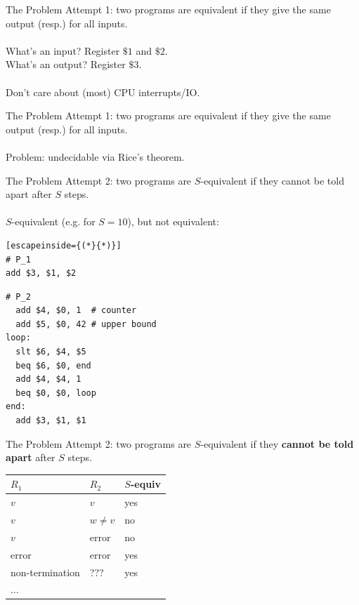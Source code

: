 \documentclass[pdf]{beamer}
\begin{document}
\begin{frame}{The Problem}
Attempt 1: two programs are equivalent if they give the same output (resp.) for all inputs.
\pause
\\~\\
\pause
What's an input?
\pause
Register $\$1$ and $\$2$.
\pause
\\
What's an output?
\pause
Register $\$3$. 
\pause
\\~\\
Don't care about (most) CPU interrupts/IO.
\end{frame}

\begin{frame}{The Problem}
Attempt 1: two programs are equivalent if they give the same output (resp.) for all inputs.
\pause
\\~\\
Problem: undecidable via Rice's theorem.
\end{frame}

\begin{frame}[fragile]{The Problem}
Attempt 2: two programs are $S$-equivalent if they cannot be told apart after $S$ steps.
\pause
\\~\\
$S$-equivalent (e.g. for $S = 10$), but not equivalent:
\begin{multicols}{2}
\begin{lstlisting}[escapeinside={(*}{*)}]
# P_1
add $3, $1, $2
\end{lstlisting}
\vfill\null
\columnbreak
\begin{lstlisting}
# P_2
  add $4, $0, 1  # counter
  add $5, $0, 42 # upper bound
loop:
  slt $6, $4, $5 
  beq $6, $0, end
  add $4, $4, 1
  beq $0, $0, loop
end:
  add $3, $1, $1  
\end{lstlisting}
\end{multicols}
\end{frame}

\begin{frame}{The Problem}
Attempt 2: two programs are $S$-equivalent if they \textbf{cannot be told apart} after $S$ steps.
\vspace{1cm}

\begin{tabular}{l | l | l}
$R_1$ & $R_2$ & $S$-equiv \\
\hline
\pause
$v$ & $v$ & yes \\
\pause
$v$ & $w \neq v$ & no \\
\pause
$v$ & error & no \\
\pause
error & error & yes \\
\pause
non-termination & ??? & yes \\
$\ldots$

\end{tabular}
\end{frame}
\end{document}
